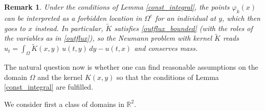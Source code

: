 \documentclass[a4paper,12pt]{amsart}
\newtheorem{rem}[theorem]{Remark}
\newcommand{\R}{\mathbb{R}}
\begin{document}
     \begin{rem}
     Under the conditions of Lemma \ref{const_integral},  the points ${\varphi_k}(x)$ can be interpreted  as a  {forbidden}  location in $\Omega^c$ for  {an individual at} $y$, which then  goes to
     $x$ instead. {In particular, $\tilde K$ satisfies \eqref{outflux_bounded} (with the roles of the variables as in \eqref{outflux}), so the Neumann problem with kernel $\tilde K$ reads $u_t = \int_\Omega \tilde K(x,y)\, u(t,y)\, dy - u(t,x)$ and conserves mass.}
     \end{rem}

 The natural question now is whether one can find reasonable assumptions  on the domain $\Omega$ and the kernel $K(x,y)$ so that the conditions of { Lemma \ref{const_integral} } are fulfilled.

  We consider first a class of  domains in $\R^2$.
\end{document}

